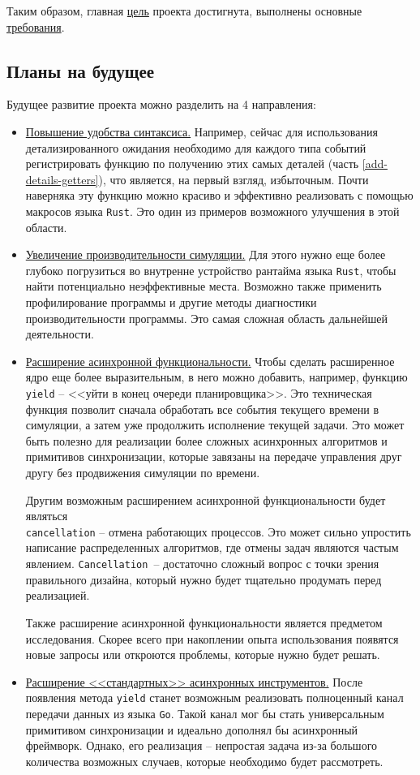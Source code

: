 Таким образом, главная \hyperref[main-purpose]{цель} проекта достигнута,  выполнены основные \hyperref[requirements]{требования}. 

\subsection{Планы на будущее} \label{future-plans}
Будущее развитие проекта можно разделить на 4 направления: 
\begin{itemize}
    \item \underline{Повышение удобства синтаксиса.} Например, сейчас для использования детализированного ожидания необходимо для каждого типа событий регистрировать функцию по получению этих самых деталей (часть \ref{add-details-getters}), что является, на первый взгляд, избыточным. Почти наверняка эту функцию можно красиво и эффективно реализовать с помощью макросов языка \texttt{Rust}. Это один из примеров возможного улучшения в этой области. 
    \item \underline{Увеличение производительности симуляции.} Для этого нужно еще более глубоко погрузиться во внутренне устройство рантайма языка \texttt{Rust}, чтобы найти потенциально неэффективные места. Возможно также применить профилирование программы и другие методы диагностики производительности программы. Это самая сложная область дальнейшей деятельности. 
    \item \underline{Расширение асинхронной функциональности.} Чтобы сделать расширенное ядро еще более выразительным, в него можно добавить, например, функцию \texttt{yield} -- <<уйти в конец очереди планировщика>>. Это техническая функция позволит сначала обработать все события текущего времени в симуляции, а затем уже продолжить исполнение текущей задачи. Это может быть полезно для реализации более сложных асинхронных алгоритмов и примитивов синхронизации, которые завязаны на передаче управления друг другу без продвижения симуляции по времени. 
    
    Другим возможным расширением асинхронной функциональности будет являться \\ \texttt{cancellation} -- отмена работающих процессов. Это может сильно упростить написание распределенных алгоритмов, где отмены задач являются частым явлением. \texttt{Cancellation}~-- достаточно сложный вопрос с точки зрения правильного дизайна, который нужно будет тщательно продумать перед реализацией.
    
    Также расширение асинхронной функциональности является предметом исследования. Скорее всего при накоплении опыта использования появятся новые запросы или откроются проблемы, которые нужно будет решать.
    \item \underline{Расширение <<стандартных>> асинхронных инструментов.} После появления метода \texttt{yield} станет возможным реализовать полноценный канал передачи данных из языка \texttt{Go}. Такой канал мог бы стать универсальным примитивом синхронизации и  идеально дополнял бы асинхронный фреймворк. Однако, его реализация -- непростая задача из-за большого количества возможных случаев, которые необходимо будет рассмотреть.  
    

\end{itemize}
